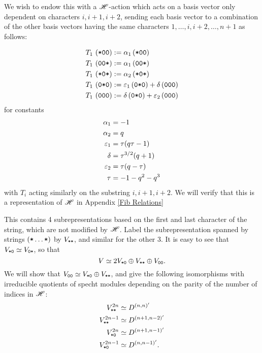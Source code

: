 \documentclass{amsart}
\begin{document}
We wish to endow this with a $\mathscr{H}$-action which acts on a basis vector only dependent on characters $i,i+1,i+2$, sending each basis vector to a combination of the other basis vectors having the same characters $1,\dots,i,i+2,\dots,n+1$ as follows:

\begin{equation} 
  \begin{split}
    T_1 \, \left( \texttt{*}\texttt{0}\texttt{0} \right) &:= \alpha_1\left( \texttt{*}\texttt{0}\texttt{0} \right)\\
    T_1 \, \left( \texttt{0}\texttt{0}\texttt{*} \right) &:= \alpha_1\left( \texttt{0}\texttt{0}\texttt{*} \right)\\
    T_1 \, \left( \texttt{*}\texttt{0}\texttt{*} \right) &:= \alpha_2\left( \texttt{*}\texttt{0}\texttt{*} \right)\\
    T_1 \, \left( \texttt{0}\texttt{*}\texttt{0} \right) &:= \varepsilon_1\left( \texttt{0}\texttt{*}\texttt{0} \right) + \delta\left( \texttt{0}\texttt{0}\texttt{0} \right)\\
    T_1 \, \left( \texttt{0}\texttt{0}\texttt{0} \right) &:= \delta\left( \texttt{0}\texttt{*}\texttt{0} \right) + \varepsilon_2\left( \texttt{0}\texttt{0}\texttt{0} \right)
\end{split} \label{Fib Action} 
\end{equation}
for constants
\begin{equation}
  \begin{split}
  \alpha_1 &= -1\\
  \alpha_2 &= q\\
  \varepsilon_1 &= \tau(q\tau - 1)\\
  \delta &= \tau^{3/2}(q + 1)\\
  \varepsilon_2 &= \tau(q-\tau)\\
  \tau &= -1-q^2-q^3
\end{split} \label{Fib Constants} 
\end{equation}
with $T_i$ acting similarly on the substring $i,i+1,i+2$.
We will verify that this is a representation of $\mathscr{H}$ in Appendix \ref{Fib Relations}

This contains 4 subrepresentations based on the first and last character of the string, which are not modified by $\mathscr{H}$.
Label the subrepresentation spanned by strings $(\texttt{*}\dots\texttt{*})$ by $V_{\texttt{*}\texttt{*}}$, and similar for the other 3.
It is easy to see that $V_{\texttt{*}\texttt{0}} \simeq V_{\texttt{0}\texttt{*}}$, so that
\[
  V \simeq 2V_{\texttt{*}\texttt{0}} \oplus V_{\texttt{*}\texttt{*}} \oplus V_{\texttt{0}\texttt{0}}.
\]
We will show that $V_{\texttt{0}\texttt{0}} \simeq V_{\texttt{*}\texttt{0}} \oplus V_{\texttt{*}\texttt{*}}$, and give the following isomorphisms with irreducible quotients of specht modules depending on the parity of the number of indices in $\mathscr{H}$:
\begin{equation}
  \begin{split}    
    V^{2n}_{\texttt{*}\texttt{*}} &\simeq D^{(n,n)'}\\ 
    V^{2n-1}_{\texttt{*}\texttt{*}} &\simeq D^{(n+1,n-2)'}\\
    V^{2n}_{\texttt{*}\texttt{0}} &\simeq D^{(n+1,n-1)'}\\
    V^{2n-1}_{\texttt{*}\texttt{0}} &\simeq D^{(n,n-1)'}.
  \end{split} \label{Fib Isos}
\end{equation}
\end{document}
